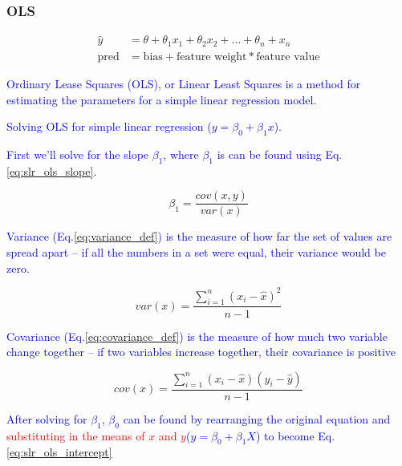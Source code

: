 \subsubsection{OLS}



\begin{equation}
	\begin{split}
		\hat{y} & = \theta + \theta_1 x_1 + \theta_2 x_2 + ... + \theta_n + x_n  \\
		  \textrm{pred} & = \textrm{bias} + \textrm{feature weight} * \textrm{feature value}
	\end{split}
\end{equation}

\textcolor{blue}{{Ordinary Lease Squares (OLS)}, or {Linear Least Squares} is a method for estimating the parameters for a simple linear regression model.}

\textcolor{blue}{Solving OLS for simple linear regression ($y=\beta_0 + \beta_1 x$).}

\textcolor{blue}{First we'll solve for the slope $\beta_1$, where $\beta_1$ is can be found using Eq.\ref{eq:slr_ols_slope}.}

\begin{equation}
{\beta_1 =  \frac{cov(x,y)}{var(x)}}
\label{eq:slr_ols_slope}
\end{equation}


\textcolor{blue}{Variance (Eq.\ref{eq:variance_def}) is the measure of how far the set of values are spread apart -- if all the numbers in a set were equal, their variance would be zero.}

\begin{equation}
{var(x) = \frac{\sum_{i=1}^{n}(x_i - \hat{x})^2}{n-1}}
\label{eq:variance_def}
\end{equation}


\textcolor{blue}{Covariance (Eq.\ref{eq:covariance_def}) is the measure of how much two variable change together -- if two variables increase together, their covariance is positive}

\begin{equation}
{cov(x) = \frac{\sum_{i=1}^{n}(x_i - \hat{x})(y_i - \hat{y})}{n-1}}
\label{eq:covariance_def}
\end{equation}

\textcolor{blue}{After solving for $\beta_1$, $\beta_0$ can be found by rearranging the original equation and \textcolor{red}{substituting in the means of $x$ and $y$}($y=\beta_0 + \beta_1 X$) to become Eq.\ref{eq:slr_ols_intercept}}


